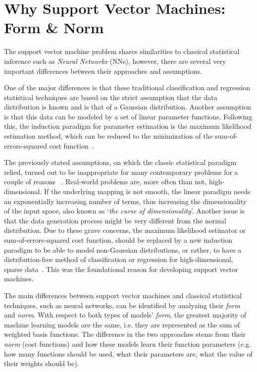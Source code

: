 \documentclass[reqno]{vcuthesis}
\numberwithin{equation}{chapter}
\begin{document}
\section{Why Support Vector Machines: Form \& Norm}
The support vector machine problem shares similarities to classical statistical inference such as \textit{Neural Networks} (NNs), however, there are several very important differences between their approaches and assumptions. 

One of the major differences is that these traditional classification and regression statistical techniques are based on the strict assumption that the data distribution is known and is that of a Gaussian distribution. Another assumption is that this data can be modeled by a set of linear parameter functions. Following this, the induction paradigm for parameter estimation is the maximum likelihood estimation method, which can be reduced to the minimization of the sum-of-errors-squared cost function~\cite{Kecman2001}. 

The previously stated assumptions, on which the classic statistical paradigm relied, turned out to be inappropriate for many contemporary problems for a couple of reasons~\cite{vapnik1997support} . Real-world problems are, more often than not, high-dimensional. If the underlying mapping is not smooth, the linear paradigm needs an exponentially increasing number of terms, thus increasing the dimensionality of the input space, also known as `\textit{the curse of dimensionality}'. Another issue is that the data generation process might be very different from the normal distribution. Due to these grave concerns, the maximum likelihood estimator or sum-of-errors-squared cost function, should be replaced by a new induction paradigm to be able to model non-Gaussian distributions, or rather, to have a distribution-free method of classification or regression for high-dimensional, sparse data~\cite{Kecman2001}. This was the foundational reason for developing support vector machines.

The main differences between support vector machines and classical statistical techniques, such as neural networks, can be identified by analyzing their \textit{form} and \textit{norm}. With respect to both types of models' \textit{form}, the greatest majority of machine learning models are the same, i.e. they are represented as the sum of weighted basis functions. The difference in the two approaches stems from their \textit{norm} (cost functions) and how these models learn their function parameters (e.g. how many functions should be used, what their parameters are, what the value of their weights should be). 
\end{document}
